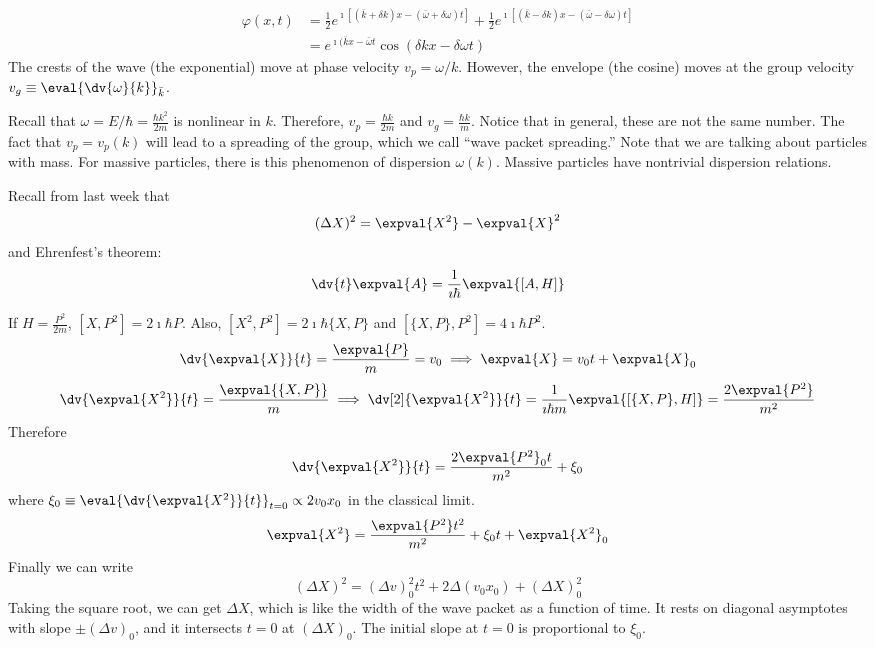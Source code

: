 \documentclass[a4paper,twoside,master.tex]{subfiles}
\begin{document}
\begin{align}
    \varphi(x,t) &= \frac{1}{2} e^{\imath[(\bar{k} + \delta k)x-(\bar{\omega}+\delta\omega)t]} + \frac{1}{2} e^{\imath[(\bar{k} - \delta k)x-(\bar{\omega}-\delta\omega)t]}\\
    &= e^{\imath(\bar{k}x-\bar{\omega}t} \cos(\delta k x - \delta\omega t)
\end{align}
The crests of the wave (the exponential) move at phase velocity $ v_p = \omega/k $. However, the envelope (the cosine) moves at the group velocity $ v_g \equiv \eval{\dv{\omega}{k}}_{\bar{k}} $.

Recall that $ \omega = E/\hbar =\frac{\hbar k^2}{2 m} $ is nonlinear in $ k $. Therefore, $ v_p = \frac{\hbar k}{2m} $ and $ v_g = \frac{\hbar k}{m} $. Notice that in general, these are not the same number. The fact that $ v_p = v_p(k) $ will lead to a spreading of the group, which we call ``wave packet spreading.'' Note that we are talking about particles with mass. For massive particles, there is this phenomenon of dispersion $ \omega(k) $. Massive particles have nontrivial dispersion relations.

Recall from last week that
\begin{equation}
    (\Delta X)^2 = \expval{X^2}-\expval{X}^2
\end{equation}
and Ehrenfest's theorem:
\begin{equation}
    \dv{t}\expval{A} = \frac{1}{\imath\hbar} \expval{[A,H]}
\end{equation}

If $ H = \frac{P^2}{2m} $, $ [X,P^2] = 2\imath\hbar P $. Also, $ [X^2, P^2] = 2\imath\hbar\{X,P\} $ and $ [\{X,P\},P^2] = 4 \imath\hbar P^2 $.
\begin{equation}
    \dv{\expval{X}}{t} = \frac{\expval{P}}{m} = v_0 \implies \expval{X} = v_0 t + \expval{X}_0
\end{equation}
\begin{equation}
    \dv{\expval{X^2}}{t} = \frac{\expval{\{X,P\}}}{m} \implies \dv[2]{\expval{X^2}}{t} = \frac{1}{\imath\hbar m} \expval{[\{X,P\},H]} = \frac{2\expval{P^2}}{m^2}
\end{equation}
Therefore
\begin{equation}
    \dv{\expval{X^2}}{t}= \frac{2\expval{P^2}_0 t}{m^2} + \xi_0
\end{equation}
where $ \xi_0 \equiv \eval{\dv{\expval{X^2}}{t}}_{t=0} \propto 2 v_0 x_0 $ in the classical limit.
\begin{equation}
    \expval{X^2} = \frac{\expval{P^2} t^2}{m^2} + \xi_0 t + \expval{X^2}_0
\end{equation}
Finally we can write
\begin{equation}
    (\Delta X)^2 = (\Delta v)_0^2 t^2 + 2 \Delta (v_0x_0) + (\Delta X)_0^2
\end{equation}
Taking the square root, we can get $ \Delta X $, which is like the width of the wave packet as a function of time. It rests on diagonal asymptotes with slope $ \pm(\Delta v)_0 $, and it intersects $ t = 0 $ at $ (\Delta X)_0 $. The initial slope at $ t = 0 $ is proportional to $ \xi_0 $.
\end{document}
